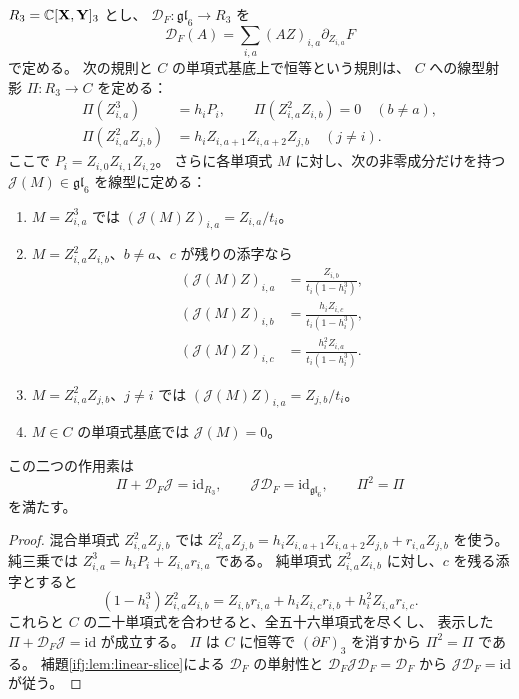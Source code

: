 \begin{proposition}
\label{ifj:prop:explicit-jacobian-projector}
$R_3=\mathbb C[\mathbf X,\mathbf Y]_3$ とし、
$\mathcal D_F:\mathfrak{gl}_6\to R_3$ を
\[
 \mathcal D_F(A)=\sum_{i,a}(AZ)_{i,a}\partial_{Z_{i,a}}F
\]
で定める。
次の規則と $C$ の単項式基底上で恒等という規則は、
$C$ への線型射影 $\Pi:R_3\to C$ を定める：
\begin{align}
 \Pi(Z_{i,a}^3)&=h_iP_i,\qquad
 \Pi(Z_{i,a}^2Z_{i,b})=0\quad(b\ne a),\label{ifj:eq:projector-pure}\\
 \Pi(Z_{i,a}^2Z_{j,b})
   &=h_i Z_{i,a+1}Z_{i,a+2}Z_{j,b}\quad(j\ne i).
   \label{ifj:eq:projector-mixed}
\end{align}
ここで $P_i=Z_{i,0}Z_{i,1}Z_{i,2}$。
さらに各単項式 $M$ に対し、次の非零成分だけを持つ
$\mathcal J(M)\in\mathfrak{gl}_6$ を線型に定める：
\begin{enumerate}
 \item $M=Z_{i,a}^3$ では
 $(\mathcal J(M)Z)_{i,a}=Z_{i,a}/t_i$。
 \item $M=Z_{i,a}^2Z_{i,b}$、$b\ne a$、$c$ が残りの添字なら
 \[
 \begin{split}
 (\mathcal J(M)Z)_{i,a}&=\frac{Z_{i,b}}{t_i(1-h_i^3)},\\
 (\mathcal J(M)Z)_{i,b}&=\frac{h_iZ_{i,c}}{t_i(1-h_i^3)},\\
 (\mathcal J(M)Z)_{i,c}&=\frac{h_i^2Z_{i,a}}{t_i(1-h_i^3)}.
 \end{split}
 \]
 \item $M=Z_{i,a}^2Z_{j,b}$、$j\ne i$ では
 $(\mathcal J(M)Z)_{i,a}=Z_{j,b}/t_i$。
 \item $M\in C$ の単項式基底では $\mathcal J(M)=0$。
\end{enumerate}
この二つの作用素は
\begin{equation}\label{ifj:eq:explicit-splitting}
 \Pi+\mathcal D_F\mathcal J=\mathrm{id}_{R_3},
 \qquad
 \mathcal J\mathcal D_F=\mathrm{id}_{\mathfrak{gl}_6},
 \qquad \Pi^2=\Pi
\end{equation}
を満たす。
\end{proposition}

\begin{proof}
混合単項式 $Z_{i,a}^2Z_{j,b}$ では
$Z_{i,a}^2Z_{j,b}
 =h_iZ_{i,a+1}Z_{i,a+2}Z_{j,b}+r_{i,a}Z_{j,b}$
を使う。純三乗では
$Z_{i,a}^3=h_iP_i+Z_{i,a}r_{i,a}$ である。
純単項式 $Z_{i,a}^2Z_{i,b}$ に対し、$c$ を残る添字とすると
\[
 (1-h_i^3)Z_{i,a}^2Z_{i,b}
 =Z_{i,b}r_{i,a}+h_iZ_{i,c}r_{i,b}
                         +h_i^2Z_{i,a}r_{i,c}.
\]
これらと $C$ の二十単項式を合わせると、全五十六単項式を尽くし、
表示した $\Pi+\mathcal D_F\mathcal J=\mathrm{id}$ が成立する。
$\Pi$ は $C$ に恒等で $(\partial F)_3$ を消すから
$\Pi^2=\Pi$ である。
補題\ref{ifj:lem:linear-slice}による $\mathcal D_F$ の単射性と
$\mathcal D_F\mathcal J\mathcal D_F=\mathcal D_F$ から
$\mathcal J\mathcal D_F=\mathrm{id}$ が従う。
\end{proof}

